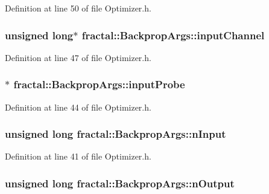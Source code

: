 Definition at line 50 of file Optimizer.\+h.

\hypertarget{classfractal_1_1BackpropArgs_a054d628aec63cc312e2e211406fefd69}{
\subsubsection[{input\+Channel}]{\setlength{\rightskip}{0pt plus 5cm}unsigned long$\ast$ fractal\+::\+Backprop\+Args\+::input\+Channel}}\label{classfractal_1_1BackpropArgs_a054d628aec63cc312e2e211406fefd69}


Definition at line 47 of file Optimizer.\+h.

\hypertarget{classfractal_1_1BackpropArgs_a18a7ad6ff596d8f16388dae85d07794c}{
\subsubsection[{input\+Probe}]{$\ast$ fractal\+::\+Backprop\+Args\+::input\+Probe}}\label{classfractal_1_1BackpropArgs_a18a7ad6ff596d8f16388dae85d07794c}


Definition at line 44 of file Optimizer.\+h.

\hypertarget{classfractal_1_1BackpropArgs_a739d6ed1aa4132bd9fb18606fa1e1a17}{
\subsubsection[{n\+Input}]{\setlength{\rightskip}{0pt plus 5cm}unsigned long fractal\+::\+Backprop\+Args\+::n\+Input}}\label{classfractal_1_1BackpropArgs_a739d6ed1aa4132bd9fb18606fa1e1a17}


Definition at line 41 of file Optimizer.\+h.

\hypertarget{classfractal_1_1BackpropArgs_a7b30c33f1ae37ce7e3b193a1560a292d}{
\subsubsection[{n\+Output}]{\setlength{\rightskip}{0pt plus 5cm}unsigned long fractal\+::\+Backprop\+Args\+::n\+Output}}\label{classfractal_1_1BackpropArgs_a7b30c33f1ae37ce7e3b193a1560a292d}


